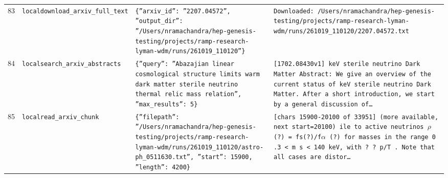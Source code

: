 \documentclass[11pt,a4paper]{article}
\begin{document}
\begin{longtable}{@{}p{}p{}p{}p{}@{}}
83 & \texttt{local}\newline\texttt{download\_\allowbreak{}arxiv\_\allowbreak{}full\_\allowbreak{}text} & \texttt{\{''arxiv\_\allowbreak{}id'':\allowbreak{} ''2207.04572'',\allowbreak{} ''output\_\allowbreak{}dir'':\allowbreak{} ''/\allowbreak{}Users/\allowbreak{}nramachandra/\allowbreak{}hep-genesis-testing/\allowbreak{}projects/\allowbreak{}ramp-research-lyman-wdm/\allowbreak{}runs/\allowbreak{}261019\_\allowbreak{}110120''\}\allowbreak{}} & \texttt{Downloaded:\allowbreak{} /\allowbreak{}Users/\allowbreak{}nramachandra/\allowbreak{}hep-genesis-testing/\allowbreak{}projects/\allowbreak{}ramp-research-lyman-wdm/\allowbreak{}runs/\allowbreak{}261019\_\allowbreak{}110120/\allowbreak{}2207.04572.txt} \\
84 & \texttt{local}\newline\texttt{search\_\allowbreak{}arxiv\_\allowbreak{}abstracts} & \texttt{\{''query'':\allowbreak{} ''Abazajian linear cosmological structure limits warm dark matter sterile neutrino thermal relic mass relation'',\allowbreak{} ''max\_\allowbreak{}results'':\allowbreak{} 5\}\allowbreak{}} & \texttt{[1702.08430v1]\allowbreak{} keV sterile neutrino Dark Matter Abstract:\allowbreak{} We give an overview of the current status of keV sterile neutrino Dark Matter. After a short introduction,\allowbreak{} we start by a general discussion of\ldots{}\allowbreak{}} \\
85 & \texttt{local}\newline\texttt{read\_\allowbreak{}arxiv\_\allowbreak{}chunk} & \texttt{\{''filepath'':\allowbreak{} ''/\allowbreak{}Users/\allowbreak{}nramachandra/\allowbreak{}hep-genesis-testing/\allowbreak{}projects/\allowbreak{}ramp-research-lyman-wdm/\allowbreak{}runs/\allowbreak{}261019\_\allowbreak{}110120/\allowbreak{}astro-ph\_\allowbreak{}0511630.txt'',\allowbreak{} ''start'':\allowbreak{} 15900,\allowbreak{} ''length'':\allowbreak{} 4200\}\allowbreak{}} & \texttt{[chars 15900-20100 of 33951]\allowbreak{} (more available,\allowbreak{} next start=\allowbreak{}20100)\allowbreak{}  ile to active neutrinos $\rho$(?)\allowbreak{} =\allowbreak{} fs(?)\allowbreak{}/\allowbreak{}f$\alpha$ (?)\allowbreak{} for masses in the range 0 .3 \textless{}\allowbreak{} m s \textless{}\allowbreak{} 140 keV,\allowbreak{} with ? ? p/\allowbreak{}T . Note that all cases are distor\ldots{}\allowbreak{}} \\

\end{longtable}
\end{document}
